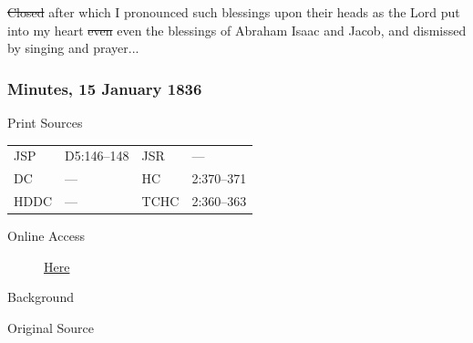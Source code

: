					\sout{Closed} after which I pronounced such blessings upon their heads as the Lord put into my heart \sout{even} even the blessings of Abraham Isaac and Jacob, and dismissed by singing and prayer...
					
		\subsubsection{Minutes, 15 January 1836}
			\label{EMS-1836-JS-15-JAN-1836}
			
			\begin{description}
					\item[Print Sources]
				\end{description}

					\begin{tabular}{p{0.5in}p{1in}p{0.5in}p{1in}}
					JSP	 	& D5:146--148		& JSR 		& --- \\
					DC	 	& ---				& HC 		& 2:370--371 \\
					HDDC 	& ---				& TCHC 		& 2:360--363 \\
					\end{tabular}
				
				\begin{description}
					\item[Online Access] \href{https://www.josephsmithpapers.org/paper-summary/minutes-15-january-1836/1}{Here}
				\end{description}
				
				\begin{description}
					\item[Background]
				\end{description}
				
				
				\begin{description}
					\item[Original Source]
				\end{description}
				
				
